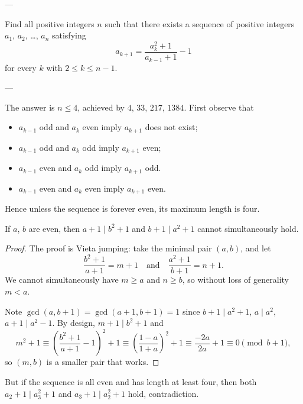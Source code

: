
---

Find all positive integers $n$ such that there exists a sequence of positive integers $a_1$, $a_2$, \ldots, $a_n$ satisfying \[a_{k+1}=\frac{a_k^2+1}{a_{k-1}+1}-1\]
for every $k$ with $2\le k\le n-1$.

---

The answer is $n\le4$, achieved by $4$, $33$, $217$, $1384$. First observe that
\begin{itemize}[itemsep=0em]
    \item $a_{k-1}$ odd and $a_k$ even imply $a_{k+1}$ does not exist;
    \item $a_{k-1}$ odd and $a_k$ odd imply $a_{k+1}$ even;
    \item $a_{k-1}$ even and $a_k$ odd imply $a_{k+1}$ odd.
    \item $a_{k-1}$ even and $a_k$ even imply $a_{k+1}$ even.
\end{itemize}
Hence unless the sequence is forever even, its maximum length is four.
\begin{lemma*}
    If $a$, $b$ are even, then $a+1\mid b^2+1$ and $b+1\mid a^2+1$ cannot simultaneously hold.
\end{lemma*}
\begin{proof}
    The proof is Vieta jumping: take the minimal pair $(a,b)$, and let \[\frac{b^2+1}{a+1}=m+1\quad\text{and}\quad\frac{a^2+1}{b+1}=n+1.\]
    We cannot simultaneously have $m\ge a$ and $n\ge b$, so without loss of generality $m<a$.

    Note $\gcd(a,b+1)=\gcd(a+1,b+1)=1$ since $b+1\mid a^2+1$, $a\mid a^2$, $a+1\mid a^2-1$. By design, $m+1\mid b^2+1$ and \[m^2+1\equiv\left(\frac{b^2+1}{a+1}-1\right)^2+1\equiv\left(\frac{1-a}{1+a}\right)^2+1\equiv\frac{-2a}{2a}+1\equiv0\pmod{b+1},\]
    so $(m,b)$ is a smaller pair that works.
\end{proof}

But if the sequence is all even and has length at least four, then both $a_2+1\mid a_3^2+1$ and $a_3+1\mid a_2^2+1$ hold, contradiction.

